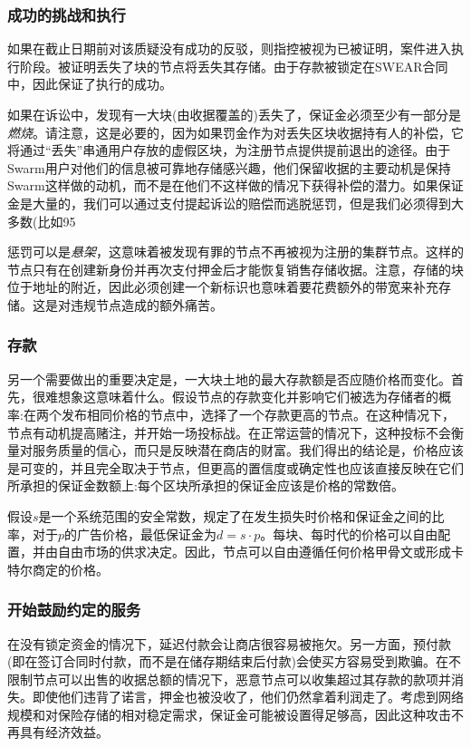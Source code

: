 \subsubsection{成功的挑战和执行}

如果在截止日期前对该质疑没有成功的反驳，则指控被视为已被证明，案件进入执行阶段。被证明丢失了块的节点将丢失其存储。由于存款被锁定在SWEAR合同中，因此保证了执行的成功。

如果在诉讼中，发现有一大块(由收据覆盖的)丢失了，保证金必须至少有一部分是\emph{燃烧}。请注意，这是必要的，因为如果罚金作为对丢失区块收据持有人的补偿，它将通过“丢失”串通用户存放的虚假区块，为注册节点提供提前退出的途径。由于Swarm用户对他们的信息被可靠地存储感兴趣，他们保留收据的主要动机是保持Swarm这样做的动机，而不是在他们不这样做的情况下获得补偿的潜力。如果保证金是大量的，我们可以通过支付提起诉讼的赔偿而逃脱惩罚，但是我们必须得到大多数(比如95%

惩罚可以是\emph{悬架}，这意味着被发现有罪的节点不再被视为注册的集群节点。这样的节点只有在创建新身份并再次支付押金后才能恢复销售存储收据。注意，存储的块位于地址的附近，因此必须创建一个新标识也意味着要花费额外的带宽来补充存储。这是对违规节点造成的额外痛苦。


\subsubsection{存款}

另一个需要做出的重要决定是，一大块土地的最大存款额是否应随价格而变化。首先，很难想象这意味着什么。假设节点的存款变化并影响它们被选为存储者的概率:在两个发布相同价格的节点中，选择了一个存款更高的节点。在这种情况下，节点有动机提高赌注，并开始一场投标战。在正常运营的情况下，这种投标不会衡量对服务质量的信心，而只是反映潜在商店的财富。我们得出的结论是，价格应该是可变的，并且完全取决于节点，但更高的置信度或确定性也应该直接反映在它们所承担的保证金数额上:每个区块所承担的保证金应该是价格的常数倍。

假设$s$是一个系统范围的安全常数，规定了在发生损失时价格和保证金之间的比率，对于$p$的广告价格，最低保证金为$d=s\cdot p$。每块、每时代的价格可以自由配置，并由自由市场的供求决定。因此，节点可以自由遵循任何价格甲骨文或形成卡特尔商定的价格。

\subsubsection{开始鼓励约定的服务}

在没有锁定资金的情况下，延迟付款会让商店很容易被拖欠。另一方面，预付款(即在签订合同时付款，而不是在储存期结束后付款)会使买方容易受到欺骗。在不限制节点可以出售的收据总额的情况下，恶意节点可以收集超过其存款的款项并消失。即使他们违背了诺言，押金也被没收了，他们仍然拿着利润走了。考虑到网络规模和对保险存储的相对稳定需求，保证金可能被设置得足够高，因此这种攻击不再具有经济效益。

